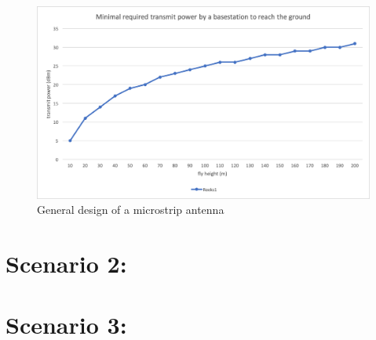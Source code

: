 \begin{figure}[h!]
  \includegraphics[width=\textwidth]{../results/s1/ptx-fh.png}
  \caption{General design of a microstrip antenna}
  \label{fig:ptxfh}
\end{figure}

\section{Scenario 2:}
\section{Scenario 3:}